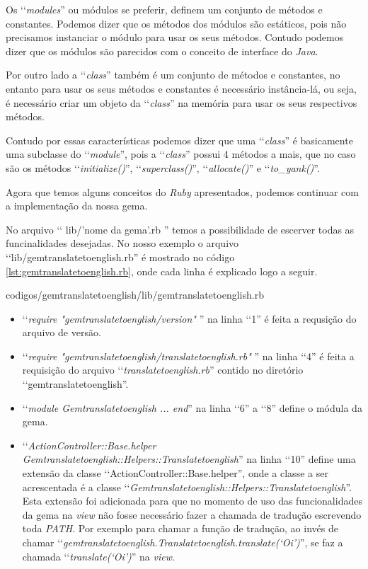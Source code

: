 Os ‘‘\emph{modules}'' ou módulos se preferir, definem um conjunto de métodos e constantes. Podemos 
dizer que os métodos dos módulos são estáticos, pois não precisamos instanciar o módulo para usar os
seus métodos. Contudo podemos dizer que os módulos são parecidos com o conceito de interface do 
\emph{Java}. 

Por outro lado a ‘‘\emph{class}'' também é um conjunto de métodos e constantes, no 
entanto para usar os seus métodos e constantes é necessário instância-lá, ou seja, é necessário criar 
um objeto da ‘‘\emph{class}'' na memória para usar os seus respectivos métodos. 

Contudo por essas características podemos dizer que uma ‘‘\emph{class}'' é basicamente 
uma subclasse do ‘‘\emph{module}'', pois a ‘‘\emph{class}'' possui 4 métodos a mais, que no caso são 
os métodos ‘‘\emph{initialize()}'', ‘‘\emph{superclass()}'', ‘‘\emph{allocate()}'' e ‘‘\emph{to\_yank()}''.

Agora que temos alguns conceitos do \emph{Ruby} apresentados, podemos continuar com a implementação 
da nossa gema. 

No arquivo ‘‘ lib/'nome da gema'.rb '' temos a possibilidade de escerver todas as 
funcinalidades desejadas. No nosso exemplo o arquivo ‘‘lib/gemtranslatetoenglish.rb'' é mostrado no código 
\ref{lst:gemtranslatetoenglish.rb}, onde cada linha é explicado 
logo a seguir.


{codigos/gemtranslatetoenglish/lib/gemtranslatetoenglish.rb}

\begin{itemize}

 \item ‘‘\emph{require "gemtranslatetoenglish/version"} '' na linha ‘‘1'' é feita a requsição do arquivo de
 versão.
 
 \item ‘‘\emph{require "gemtranslatetoenglish/translatetoenglish.rb"} '' na linha ‘‘4'' é feita a requisição
 do arquivo ‘‘\emph{translatetoenglish.rb}'' contido no diretório ‘‘gemtranslatetoenglish''.
 
 \item ‘‘\emph{module Gemtranslatetoenglish ... end}'' na linha ‘‘6'' a ‘‘8'' define o módula da gema.
 
 \item ‘‘\emph{ActionController::Base.helper Gemtranslatetoenglish::Helpers::Translatetoenglish}'' na linha 
 ‘‘10'' define uma extensão da classe ‘‘ActionController::Base.helper'', onde a classe a ser acrescentada é
 a classe ‘‘\emph{Gemtranslatetoenglish::Helpers::Translatetoenglish}''. Esta extensão foi adicionada
 para que no momento de uso das funcionalidades da gema na \emph{view} não fosse necessário fazer a chamada 
 de tradução  escrevendo toda \emph{PATH}. Por exemplo para chamar a função de tradução, ao invés
 de chamar ‘‘\emph{gemtranslatetoenglish.Translatetoenglish.translate(‘Oi’)}'', se faz a chamada 
 ‘‘\emph{translate(‘Oi’)}'' na \emph{view}.
 
\end{itemize}

